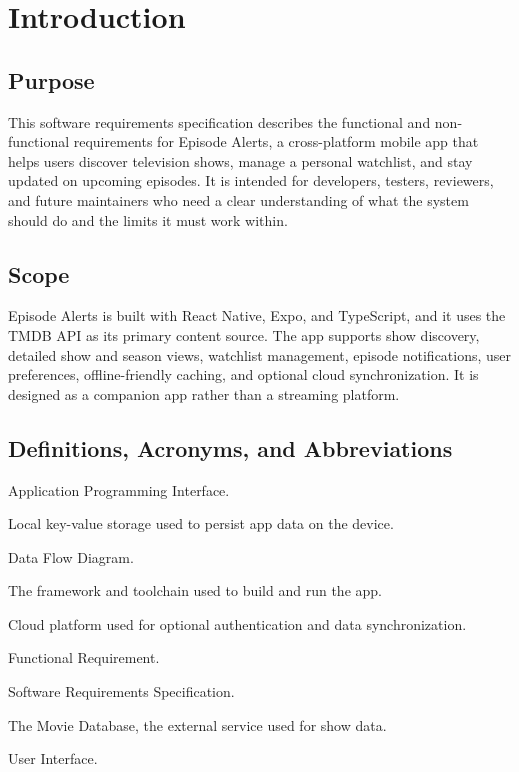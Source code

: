 \section{Introduction}

\subsection{Purpose}
This software requirements specification describes the functional and non-functional requirements for Episode Alerts, a cross-platform mobile app that helps users discover television shows, manage a personal watchlist, and stay updated on upcoming episodes. It is intended for developers, testers, reviewers, and future maintainers who need a clear understanding of what the system should do and the limits it must work within.

\subsection{Scope}
Episode Alerts is built with React Native, Expo, and TypeScript, and it uses the TMDB API as its primary content source. The app supports show discovery, detailed show and season views, watchlist management, episode notifications, user preferences, offline-friendly caching, and optional cloud synchronization. It is designed as a companion app rather than a streaming platform.

\subsection{Definitions, Acronyms, and Abbreviations}
\begin{description}[leftmargin=1.8cm, style=nextline]
	\item[API] Application Programming Interface.
	\item[AsyncStorage] Local key-value storage used to persist app data on the device.
	\item[DFD] Data Flow Diagram.
	\item[Expo] The framework and toolchain used to build and run the app.
	\item[Firebase] Cloud platform used for optional authentication and data synchronization.
	\item[FR] Functional Requirement.
	\item[SRS] Software Requirements Specification.
	\item[TMDB] The Movie Database, the external service used for show data.
	\item[UI] User Interface.
\end{description}

